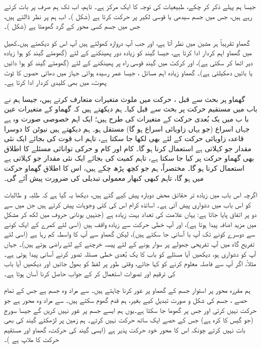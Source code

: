 جیسا ہم پہلے ذکر کر چکے، طبیعیات  کی توجہ کا ایک  مرکز ہے۔ تاہم، اب تک ہم صرف پر بات کرتے رہے ہیں، جس میں جسم سیدھی یا قوسی  لکیر  پر حرکت کرتا ہے (شکل )۔ اب ہم  پر نظر ڈالتے ہیں، جس میں جسم کسی محور کے گرد گھومتا ہے (شکل )۔

گھماو تقریباً ہر مشین میں نظر آتا ہے، اور جب  آپ دروازہ کھولتے ہیں آپ اس کو دیکھتے ہیں۔کھیل میں  گھماو اہم کردار ادا کرتا ہے، جیسا  گیند کو زیادہ دور پھینکنے کے لئے (گھومتے  گیند  کو ہوا زیادہ دیر  اٹھا  کر سکتی ہے)، اور کرکٹ میں گیند  قوسی  راہ پر پھینکنے کے لئے (گھومتے گیند کو ہوا دائیں یا بائیں دھکیلتی ہے)۔ گھماو زیادہ اہم مسائل ، جیسا      عمر رسیدہ  ہوائی جہاز میں دھاتی حصوں   کا ٹوٹ پھوٹ، میں بھی  کلیدی کردار ادا کرتا ہے۔

گھماو پر بحث سے قبل   ، حرکت میں ملوث متغیرات متعارف کرتے ہیں، جیسا ہم نے باب  میں مستقیم حرکت پر بحث سے قبل کیا۔ ہم دیکھتے ہیں کہ گھماو کے  متغیرات عین   با ب  میں یک بُعدی  حرکت  کے متغیرات کی طرح ہیں؛  ایک اہم خصوصی صورت وہ ہے جہاں اسراع (جو یہاں زاویائی اسراع ہو گا)   مستقل ہو۔ ہم دیکھتے ہیں  نیوٹن کا دوسرا قاعدہ  زاویائی حرکت کے لئے بھی لکھا جا سکتا ہے، تاہم  اب قوت  کی بجائے ایک نئی  مقدار جو  کہلاتی ہے استعمال  کرنا ہو گا۔  کام اور  کام و حرکی توانائی  مسئلے کا اطلاق   بھی گھماو  حرکت  پر کیا جا سکتا ہے، تاہم  کمیت کی بجائے ایک نئی مقدار جو  کہلاتی ہے استعمال کرنا ہو  گا۔ مختصراً،  ہم جو کچھ پڑھ چکے ہیں، اس کا اطلاق گھماو حرکت میں ہو گا، تاہم کبھی کبھار معمولی تبدیلی  کی ضرورت پیش آئے گی۔

اگرچہ اس باب میں زیادہ تر حقائق محض  دوبارہ پیش کیے گئے ہیں، دیکھا یہ گیا ہے کہ طلبہ و طالبات کو اس باب میں دشواری پیش آتی ہے۔ اساتذہ کرام اس کی کئی وجوہات پیش کرتے ہیں جن میں سے دو  پر اتفاق پایا جاتا ہے:  یہاں  علامت    کی تعداد بہت زیادہ ہے (جنہیں  یونانی حروف  میں لکھ کر  مشکل میں  مزید اضافہ پیدا ہوتا ہے)، اور   آپ خطی حرکت سے زیادہ واقف ہیں (اسی لئے  کمرے کے ایک کونے سے دوسرے کونے تک آپ  با آسانی جا سکتے ہیں)،  لیکن گھماو سے آپ کا واسطہ کم رہا ہے (اسی لئے تفریح  گاہ میں آپ  تفریحی جھولے پر سوار ہونے کے لئے پیسہ خرچنے کے لئے راضی ہوتے ہیں)۔ جہاں آپ کو دشواری ہو، دیکھیں آیا مسئلے کو  باب  کا یک بُعدی خطی مسئلہ   تصور کرنے  آسانی پیدا ہوتی ہے۔ مثلاً، اگر آپ سے فاصلہ معلوم کرنے کو کہا جائے، وقتی طور پر  لفظ  کو بھول جائیں اور دیکھیں آیا باب   کی ترقیم اور تصورات استعمال کر کے جواب حاصل کرنا آسان ہوتا ہے۔

ہم مقررہ محور  پر استوار  جسم کے گھماو  پر غور کرنا چاہتے ہیں۔ سے مراد  وہ جسم ہے جس  کے تمام  حصے  ، جسم کی شکل و صورت تبدیل کیے بغیر، ہم قدم  گھوم سکتے ہیں۔  سے مراد وہ محور ہے جو حرکت نہیں کرتی اور   جس  پر گھوما جا سکتا ہے۔یوں ہم ایسے جسم پر غور نہیں کریں گے جیسا  سورج   (جو گیس  کا کرہ  ہے) جس کے  حصے ایک ساتھ حرکت نہیں کرتے۔ ہم زمین پر  لڑھکتے گیند کی بھی بات نہیں کرتے چونکہ اس کا محور خود حرکت پذیر ہے (ایسی گیند کی حرکت،   گھماو اور  مستقیم حرکت کا ملاپ ہے )۔


